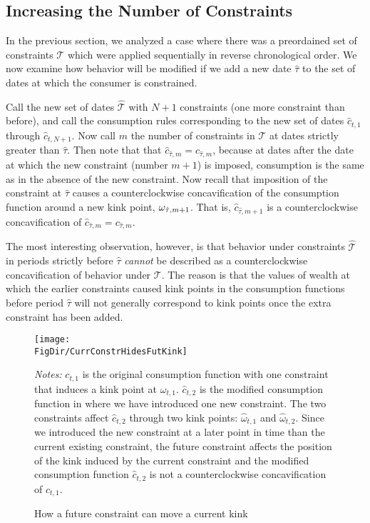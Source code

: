 \subsection{Increasing the Number of Constraints}
\label{subsec:IncreaseNumConstr}

In the previous section, we analyzed a case where there was a preordained set
of constraints $\mathcal{T}$ which were applied sequentially in reverse chronological order.  We now examine how behavior will be modified if we add a new date $\hat{\tau}$ to the set of dates at which the consumer is constrained.

Call the new set of dates $\hat{\mathcal{T}}$ with $N+1$ constraints (one more constraint than before), and call the consumption rules corresponding to the new set of dates
$\hat{c}_{t,1}$ through $\hat{c}_{t,N+1}$. Now call $m$ the
number of constraints in $\mathcal{T}$ at dates strictly
greater than $\hat{\tau}$.  Then note that that $\hat{c}_{\hat{\tau},m} =
c_{\hat{\tau},m}$, because at dates after the date at which the new constraint (number $m+1$) is
imposed, consumption is the same as in the absence of the new constraint.
Now recall that imposition of the constraint at $\hat{\tau}$ causes a counterclockwise concavification of the consumption function around a new kink point, $\omega_{\hat{\tau},m+1}$. That is, $\hat{c}_{\hat{\tau},m+1}$ is a counterclockwise concavification of $\hat{c}_{\hat{\tau},m} = c_{\hat{\tau},m}$.

The most interesting observation, however, is that behavior under constraints $\hat{\mathcal{T}}$ in periods strictly before $\hat{\tau}$ \textit{cannot} be described as a counterclockwise concavification of behavior under $\mathcal{T}$.  The reason is that the values of wealth at which the earlier constraints caused kink points in the consumption functions before period $\hat{\tau}$ will not generally correspond to kink points once the extra constraint has been added.

\hypertarget{CurrConstrHidesFutKink}{}

\begin{figure}[ht]
{\centering \texttt{[image: \\FigDir/CurrConstrHidesFutKink]}}
\caption{How a future constraint can move a current kink}
\footnotesize {\emph{Notes:} $c_{t,1}$ is the original consumption function with one constraint that induces a kink point at $\omega_{t,1}$. $\hat{c}_{t,2}$ is the modified consumption function in where we have introduced one new constraint. The two constraints affect $\hat{c}_{t,2}$ through two kink points: $\hat{\omega}_{t,1}$ and $\hat{\omega}_{t,2}$. Since we introduced the new constraint at a later point in time than the current existing constraint, the future constraint affects the position of the kink induced by the current constraint and the modified consumption function $\hat{c}_{t,2}$ is not a counterclockwise concavification of ${c}_{t,1}$.}
\label{fig:LCtHidesLCtpn}
\end{figure}

